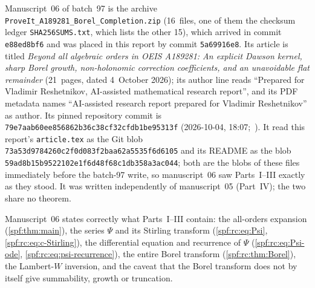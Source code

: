 \documentclass[11pt]{article}
\numberwithin{equation}{section}
\theoremstyle{definition}
\theoremstyle{remark}
\theoremstyle{definition}
\begin{document}
Manuscript~06 of batch~97 is the archive
\nolinkurl{ProveIt_A189281_Borel_Completion.zip} (16~files, one of them the
checksum ledger \texttt{SHA256SUMS.txt}, which lists the other 15), which
arrived in commit \texttt{e88ed8bf6} and was placed in this report by commit
\texttt{5a69916e8}. Its article is titled \emph{Beyond all algebraic orders
in OEIS A189281: An explicit Dawson kernel, sharp Borel growth,
non-holonomic correction coefficients, and an unavoidable flat remainder}
(21~pages, dated 4~October 2026); its author line reads ``Prepared for
Vladimir Reshetnikov, AI-assisted mathematical research report'', and its PDF
metadata names ``AI-assisted research report prepared for Vladimir
Reshetnikov'' as author. Its pinned repository commit is
\texttt{79e7aab60ee856862b36c38cf32cfdb1be95313f} (2026-10-04,
18:07;~\cite{bcProveIt}). It read this report's \texttt{article.tex} as the
Git blob \texttt{73a53d9784260c2f0d083f2baa62a5535f6d6105} and its README as
the blob \texttt{59ad8b15b9522102e1f6d48f68c1db358a3ac044}; both are the
blobs of these files immediately before the batch-97 write, so manuscript~06
saw Parts~I--III exactly as they stood. It was written independently of
manuscript~05 (Part~IV); the two share no theorem.

Manuscript~06 states correctly what Parts~I--III contain: the all-orders
expansion (\cref{spf:thm:main}), the series $\Psi$ and its Stirling transform
(\eqref{spf:rc:eq:Psi}, \eqref{spf:rc:eq:c-Stirling}), the differential
equation and recurrence of $\Psi$ (\eqref{spf:rc:eq:Psi-ode},
\eqref{spf:rc:eq:psi-recurrence}), the entire Borel transform
(\cref{spf:rc:thm:Borel}), the Lambert-$W$ inversion, and the caveat that the
Borel transform does not by itself give summability, growth or truncation.
\end{document}
